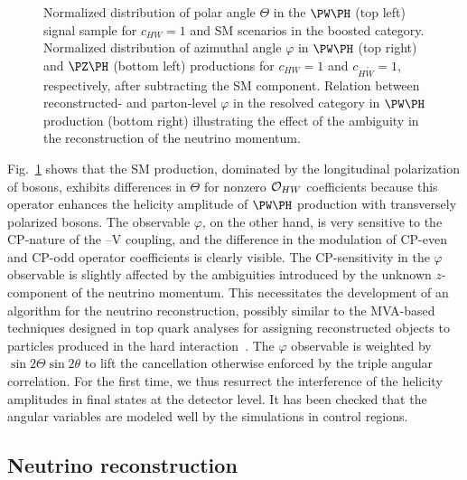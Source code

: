 \documentclass[a4paper,11pt]{article}
\renewcommand{\PV}{{{{V}}}\xspace}
\begin{document}
\begin{figure}[hbtp]
\begin{center}
\end{center}
\caption{
Normalized distribution of polar angle $\Theta$ in the $\PW\PH$ (top left) signal sample for $c_{HW}=1$ and SM scenarios in the boosted category. 
Normalized distribution of azimuthal angle $\varphi$ in  $\PW\PH$  (top right) and $\PZ\PH$ (bottom left) productions for $c_{HW}=1$ and $c_{H\widetilde{W}}=1$, respectively, after subtracting the SM component.%
Relation between reconstructed- and parton-level $\varphi$ in the resolved category in $\PW\PH$ production (bottom right) illustrating the effect of the ambiguity in the reconstruction of the neutrino momentum.
}
\label{fig:angles}
\end{figure}
Fig.~\ref{fig:angles} shows that
the SM production, dominated by the longitudinal polarization of \PW bosons, exhibits differences in $\Theta$ for nonzero ${\cal O}_{HW}$ coefficients because this operator enhances the helicity amplitude of $\PW\PH$ production with transversely polarized {\PW} bosons. 
The observable $\varphi$, on the other hand, is very sensitive to the CP-nature of the \PH--\PV coupling, and the difference in the modulation of CP-even and CP-odd operator coefficients is clearly visible.  
The CP-sensitivity in the $\varphi$ observable is slightly affected by the ambiguities introduced by the unknown $z$-component of the neutrino momentum. 
This necessitates the development of an algorithm for the neutrino reconstruction, possibly similar to the MVA-based techniques designed in top quark analyses for assigning reconstructed objects to particles produced in the hard interaction~\cite{CMS:2019esx}.
The $\varphi$ observable is weighted by $\sin2\Theta\sin2\theta$ to lift the cancellation otherwise enforced by the triple angular correlation. 
For the first time, we thus resurrect the interference of the helicity amplitudes in \PH final states at the detector level. 
It has been checked that the angular variables are modeled well by the simulations in control regions.

\subsection{Neutrino reconstruction}
\label{sec:neu_reco}
\end{document}
